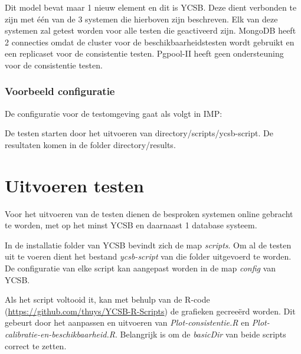 Dit model bevat maar 1 nieuw element en dit is YCSB. Deze dient verbonden te zijn met één van de 3 systemen die hierboven zijn beschreven. Elk van deze systemen zal getest worden voor alle testen die geactiveerd zijn. MongoDB heeft 2 connecties omdat de cluster voor de beschikbaarheidstesten wordt gebruikt en een replicaset voor de consistentie testen. Pgpool-II heeft geen ondersteuning voor de consistentie testen. 

\subsubsection{Voorbeeld configuratie}

De configuratie voor de testomgeving gaat als volgt in IMP: 



De testen starten door het uitvoeren van {{directory}}/scripts/ycsb-script. De resultaten komen in de folder {{directory}}/results. 


\section{Uitvoeren testen}
Voor het uitvoeren van de testen dienen de besproken systemen online gebracht te worden, met op het minst YCSB en daarnaast 1 database systeem. 

In de installatie folder van YCSB bevindt zich de map \textit{scripts}. Om al de testen uit te voeren dient het bestand \textit{ycsb-script} van die folder uitgevoerd te worden. De configuratie van elke script kan aangepast worden in de map \textit{config} van YCSB. 

Als het script voltooid it, kan met behulp van de R-code (\url{https://github.com/thuys/YCSB-R-Scripts}) de grafieken gecreeërd worden. Dit gebeurt door het aanpassen en uitvoeren van \textit{Plot-consistentie.R} en \textit{Plot-calibratie-en-beschikbaarheid.R}. Belangrijk is om de \textit{basicDir} van beide scripts correct te zetten. 